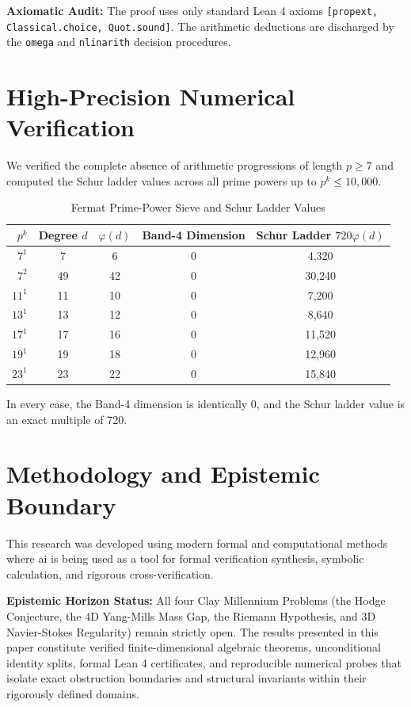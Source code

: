 \documentclass[11pt,a4paper]{article}
\theoremstyle{definition}
\begin{document}
\noindent\textbf{Axiomatic Audit:} The proof uses only standard Lean 4 axioms \texttt{[propext, Classical.choice, Quot.sound]}. The arithmetic deductions are discharged by the \texttt{omega} and \texttt{nlinarith} decision procedures.


\section{High-Precision Numerical Verification}

We verified the complete absence of arithmetic progressions of length $p \ge 7$ and computed the Schur ladder values across all prime powers up to $p^k \le 10,000$.

\begin{table}[htbp]
\centering
\caption{Fermat Prime-Power Sieve and Schur Ladder Values}
\begin{tabular}{rcccc}
\toprule
$p^k$ & Degree $d$ & $\varphi(d)$ & Band-4 Dimension & Schur Ladder $720 \varphi(d)$ \\
\midrule
$7^1$ & 7 & 6 & 0 & 4,320 \\
$7^2$ & 49 & 42 & 0 & 30,240 \\
$11^1$ & 11 & 10 & 0 & 7,200 \\
$13^1$ & 13 & 12 & 0 & 8,640 \\
$17^1$ & 17 & 16 & 0 & 11,520 \\
$19^1$ & 19 & 18 & 0 & 12,960 \\
$23^1$ & 23 & 22 & 0 & 15,840 \\
\bottomrule
\end{tabular}
\end{table}

\noindent In every case, the Band-4 dimension is identically 0, and the Schur ladder value is an exact multiple of 720.


\section{Methodology and Epistemic Boundary}
\noindent This research was developed using modern formal and computational methods where ai is being used as a tool for formal verification synthesis, symbolic calculation, and rigorous cross-verification.

\vspace{0.5em}
\noindent\textbf{Epistemic Horizon Status:} All four Clay Millennium Problems (the Hodge Conjecture, the 4D Yang-Mills Mass Gap, the Riemann Hypothesis, and 3D Navier-Stokes Regularity) remain strictly open. The results presented in this paper constitute verified finite-dimensional algebraic theorems, unconditional identity splits, formal Lean 4 certificates, and reproducible numerical probes that isolate exact obstruction boundaries and structural invariants within their rigorously defined domains.
\end{document}

